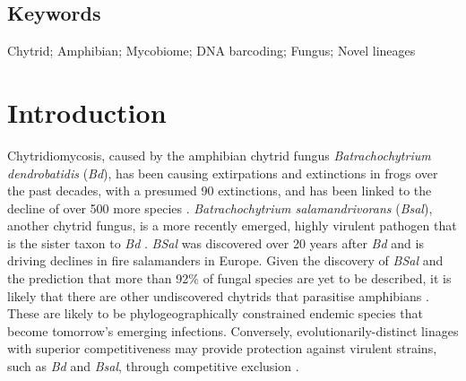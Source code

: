 \documentclass[11pt, a4paper, titlepage]{article}
\begin{document}



\linenumbers

\subsection*{Keywords}
Chytrid; Amphibian; Mycobiome; DNA barcoding; Fungus; Novel lineages

\section{Introduction}

Chytridiomycosis, caused by the amphibian chytrid fungus \textit{Batrachochytrium dendrobatidis} (\textit{Bd}), has been causing extirpations and extinctions in frogs over the past decades, with a presumed 90 extinctions, and has been linked to the decline of over 500 more species \parencite{Scheele2019}. \textit{Batrachochytrium salamandrivorans} (\textit{Bsal}), another chytrid fungus, is a more recently emerged, highly virulent pathogen that is the sister taxon to \textit{Bd} \parencite{Martel2013}. \textit{BSal} was discovered over 20 years after \textit{Bd} and is driving declines in fire salamanders in Europe. Given the discovery of \textit{BSal} and the prediction that more than 92\% of fungal species are yet to be described, it is likely that there are other undiscovered chytrids that parasitise amphibians \parencite{hawksworth2017fungal}. These are likely to be phylogeographically constrained endemic species that become tomorrow's emerging infections. Conversely, evolutionarily-distinct linages with superior competitiveness may provide protection against virulent strains, such as \textit{Bd} and \textit{Bsal}, through competitive exclusion \parencite{Hardin1960}. \newline
\end{document}
